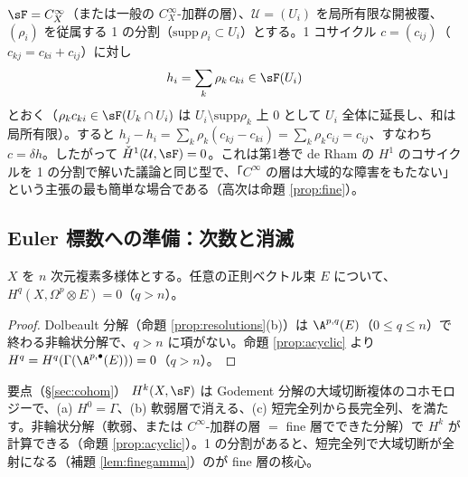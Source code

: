 \begin{ex}\label{ex:fineH1}
$\sF=C^\infty_X$（または一般の $C^\infty_X$-加群の層）、$\mathcal U=(U_i)$ を局所有限な開被覆、$(\rho_i)$ を従属する 1 の分割（$\mathrm{supp}\,\rho_i\subset U_i$）とする。1 コサイクル $c=(c_{ij})$（$c_{kj}=c_{ki}+c_{ij}$）に対し
\[
h_i=\sum_k\rho_k\,c_{ki}\in\sF(U_i)
\]
とおく（$\rho_kc_{ki}\in\sF(U_k\cap U_i)$ は $U_i\setminus\mathrm{supp}\rho_k$ 上 $0$ として $U_i$ 全体に延長し、和は局所有限）。すると $h_j-h_i=\sum_k\rho_k(c_{kj}-c_{ki})=\sum_k\rho_kc_{ij}=c_{ij}$、すなわち $c=\delta h$。したがって $\check H^1(\mathcal U,\sF)=0$。これは第1巻で de Rham の $H^1$ のコサイクルを 1 の分割で解いた議論と同じ型で、「$C^\infty$ の層は大域的な障害をもたない」という主張の最も簡単な場合である（高次は命題 \ref{prop:fine}）。
\end{ex}

\subsection{Euler 標数への準備：次数と消滅}
\begin{prop}\label{prop:vanish}\tP
$X$ を $n$ 次元複素多様体とする。任意の正則ベクトル束 $E$ について、$H^q(X,\Omega^p\otimes E)=0$（$q>n$）。
\end{prop}
\begin{proof}
Dolbeault 分解（命題 \ref{prop:resolutions}(b)）は $\A^{p,q}(E)$（$0\le q\le n$）で終わる非輪状分解で、$q>n$ に項がない。命題 \ref{prop:acyclic} より $H^q=H^q(\Gamma(\A^{p,\bullet}(E)))=0$（$q>n$）。\qedhere
\end{proof}

\begin{keybox}{要点（§\ref{sec:cohom}）}
$H^k(X,\sF)$ は Godement 分解の大域切断複体のコホモロジーで、(a) $H^0=\Gamma$、(b) 軟弱層で消える、(c) 短完全列から長完全列、を満たす。非輪状分解（軟弱、または $C^\infty$-加群の層 $=$ fine 層でできた分解）で $H^k$ が計算できる（命題 \ref{prop:acyclic}）。1 の分割があると、短完全列で大域切断が全射になる（補題 \ref{lem:finegamma}）のが fine 層の核心。
\end{keybox}


